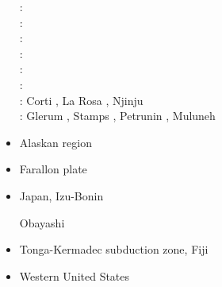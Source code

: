 \begin{itemize}
\begin{scriptsize}
\twothousandseven: \cite{mitk07}\\
\twothousandeight: \cite{cort08}\\
\twothousandnine: \cite{kekj09}\\
\twothousandten: \cite{beve10}\\
\twothousandfourteen: \cite{phcs14}\cite{sacs14}\\
\twothousandseventeen: \cite{brcr17} \cite{brcg17}\\
\twothousandnineteen: Corti \etal \cite{cocf19}, La Rosa \etal \cite{lapk19}, Njinju \etal \cite{njas19}\\
\twothousandtwenty: Glerum \etal \cite{glbs20}, Stamps \etal \cite{stkf20}, 
                    Petrunin \etal \cite{peke20}, Muluneh \etal \cite{mubi20}
\end{scriptsize}

\item{Alaskan region} 

\begin{scriptsize}
\cite{kohp10}
\cite{jabi10a}
\cite{jabi12}
\cite{jabr13}
\cite{haja17}
\cite{mimo18}
\end{scriptsize}

\item{Farallon plate} 
{\scriptsize
\cite{lisg08}
\cite{list11}
\cite{list12}
\cite{licu16}
}
\item{Japan, Izu-Bonin} 

\begin{scriptsize}
\cite{hond85}
\cite{lohd07}
Obayashi \etal \cite{obyf09}\\
\cite{vakn12}
\cite{musi13}
\cite{kigk14}\cite{leli14}\cite{mova14}\cite{hond14}
\cite{kilk15}
\cite{yagz17}
\cite{yamg19}
\cite{mapg20}
\end{scriptsize}

\item{Tonga-Kermadec subduction zone, Fiji} 

\begin{scriptsize}
\cite{bigs03}\cite{bigu03}
\cite{zhpy06}
\end{scriptsize}

\item{Western United States}



\end{itemize}
